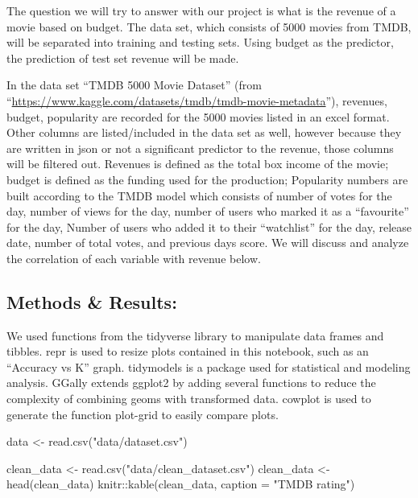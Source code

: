 \documentclass[
]{article}
\newenvironment{Shaded}{\begin{snugshade}}{\end{snugshade}}
\newcommand{\AttributeTok}[1]{\textcolor[rgb]{0.77,0.63,0.00}{#1}}
\newcommand{\FunctionTok}[1]{\textcolor[rgb]{0.00,0.00,0.00}{#1}}
\newcommand{\NormalTok}[1]{#1}
\newcommand{\OtherTok}[1]{\textcolor[rgb]{0.56,0.35,0.01}{#1}}
\newcommand{\SpecialCharTok}[1]{\textcolor[rgb]{0.00,0.00,0.00}{#1}}
\newcommand{\StringTok}[1]{\textcolor[rgb]{0.31,0.60,0.02}{#1}}
\begin{document}
The question we will try to answer with our project is what is the
revenue of a movie based on budget. The data set, which consists of 5000
movies from TMDB, will be separated into training and testing sets.
Using budget as the predictor, the prediction of test set revenue will
be made.

In the data set ``TMDB 5000 Movie Dataset'' (from
``\url{https://www.kaggle.com/datasets/tmdb/tmdb-movie-metadata}''),
revenues, budget, popularity are recorded for the 5000 movies listed in
an excel format. Other columns are listed/included in the data set as
well, however because they are written in json or not a significant
predictor to the revenue, those columns will be filtered out. Revenues
is defined as the total box income of the movie; budget is defined as
the funding used for the production; Popularity numbers are built
according to the TMDB model which consists of number of votes for the
day, number of views for the day, number of users who marked it as a
``favourite'' for the day, Number of users who added it to their
``watchlist'' for the day, release date, number of total votes, and
previous days score. We will discuss and analyze the correlation of each
variable with revenue below.

\hypertarget{methods-results}{%
\subsection{Methods \& Results:}\label{methods-results}}

We used functions from the tidyverse library to manipulate data frames
and tibbles. repr is used to resize plots contained in this notebook,
such as an ``Accuracy vs K'' graph. tidymodels is a package used for
statistical and modeling analysis. GGally extends ggplot2 by adding
several functions to reduce the complexity of combining geoms with
transformed data. cowplot is used to generate the function plot-grid to
easily compare plots.

\begin{Shaded}
\begin{Highlighting}[]
\NormalTok{data }\OtherTok{\textless{}{-}} \FunctionTok{read.csv}\NormalTok{(}\StringTok{"data/dataset.csv"}\NormalTok{)}
\end{Highlighting}
\end{Shaded}

\begin{Shaded}
\begin{Highlighting}[]
\NormalTok{clean\_data }\OtherTok{\textless{}{-}} \FunctionTok{read.csv}\NormalTok{(}\StringTok{"data/clean\_dataset.csv"}\NormalTok{)}
\NormalTok{clean\_data }\OtherTok{\textless{}{-}} \FunctionTok{head}\NormalTok{(clean\_data)}
\NormalTok{knitr}\SpecialCharTok{::}\FunctionTok{kable}\NormalTok{(clean\_data, }\AttributeTok{caption =} \StringTok{"TMDB rating"}\NormalTok{)}
\end{Highlighting}
\end{Shaded}
\end{document}
